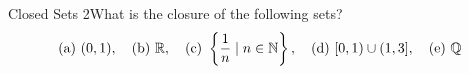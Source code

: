 \begin{example}
    {Closed Sets 2}What is the closure of the following sets? 
    \[
    (\text{a}) \ (0,1), \quad \text{(b)} \ \mathbb{R}, \quad (\text{c}) \ \left\{\frac{1}{n} \mid n \in \mathbb{N}\right\}, \quad (\text{d}) \ [0,1) \cup (1,3], \quad (\text{e}) \ \mathbb{Q}
    \]
\end{example}










